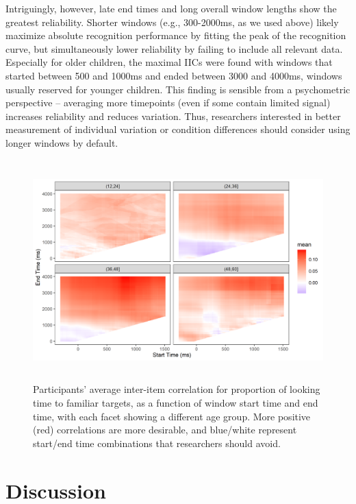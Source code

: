 \documentclass[10pt, letterpaper]{article}
\begin{document}
Intriguingly, however, late end times and long overall window lengths
show the greatest reliability. Shorter windows (e.g., 300-2000ms, as we
used above) likely maximize absolute recognition performance by fitting
the peak of the recognition curve, but simultaneously lower reliability
by failing to include all relevant data. Especially for older children,
the maximal IICs were found with windows that started between 500 and
1000ms and ended between 3000 and 4000ms, windows usually reserved for
younger children. This finding is sensible from a psychometric
perspective -- averaging more timepoints (even if some contain limited
signal) increases reliability and reduces variation. Thus, researchers
interested in better measurement of individual variation or condition
differences should consider using longer windows by default.

\begin{figure} 
\includegraphics[width=13.6cm,height=8.5cm]{../figures/interitem_cors_window_analysis.png}
\caption{Participants' average inter-item correlation for proportion of looking time to familiar targets, as a function of window start time and end time, with each facet showing a different age group. More positive (red) correlations are more desirable, and blue/white represent start/end time combinations that researchers should avoid.}
\label{fig:time_window}
\end{figure}

\hypertarget{discussion}{%
\section{Discussion}\label{discussion}}
\end{document}
